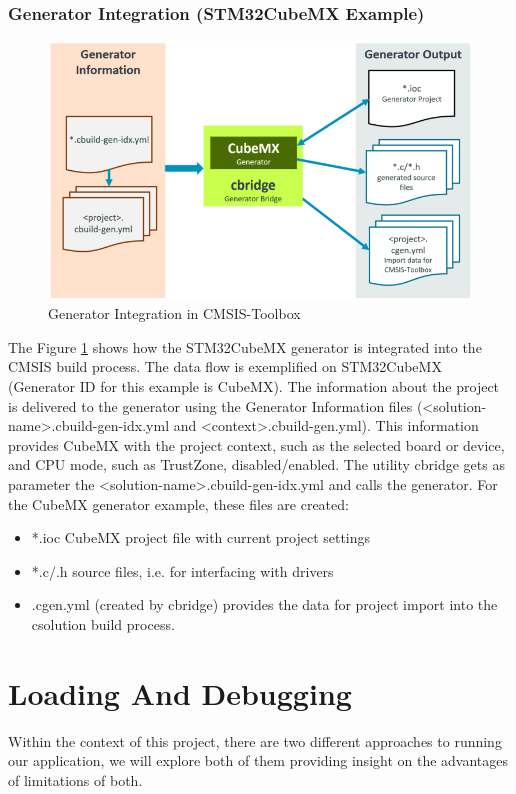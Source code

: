 \subsubsection{Generator Integration (STM32CubeMX Example)}
\begin{figure}[H]
	\centering
	\includegraphics[width=15cm]{img/Generator-Integration.png}
	\caption{Generator Integration in CMSIS-Toolbox}
	\label{fig:generator}
\end{figure}
The Figure \ref{fig:generator} shows how the STM32CubeMX generator is integrated into the CMSIS build process. The data flow is exemplified on STM32CubeMX (Generator ID for this example is CubeMX). The information about the project is delivered to the generator using the Generator Information files (<solution-name>.cbuild-gen-idx.yml and <context>.cbuild-gen.yml). This information provides CubeMX with the project context, such as the selected board or device, and CPU mode, such as TrustZone, disabled/enabled.
The utility cbridge gets as parameter the <solution-name>.cbuild-gen-idx.yml and calls the generator. For the CubeMX generator example, these files are created:
\begin{itemize}
	\item *.ioc CubeMX project file with current project settings
	\item *.c/.h source files, i.e. for interfacing with drivers
	\item <project-name>.cgen.yml (created by cbridge) provides the data for project import into the csolution build process.
\end{itemize}
\newpage
\section{Loading And Debugging}
Within the context of this project, there are two different approaches to running our application, we will explore both of them providing insight on the advantages of limitations of both.

